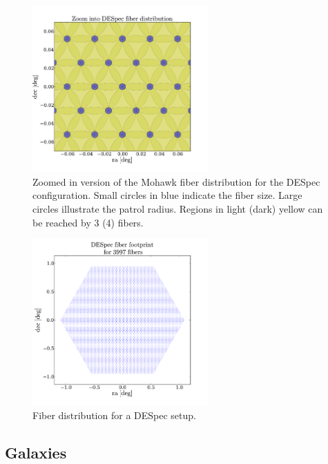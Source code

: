 \documentclass{article}
\begin{document}
\begin{figure}
\begin{center}
\includegraphics[keepaspectratio=true,width=0.6\textwidth]{DES_fibers_zoom.pdf}
\caption{\label{fig:1}Zoomed in version of the Mohawk fiber
  distribution for the DESpec configuration. Small circles in blue
  indicate the fiber size. Large circles illustrate the patrol
  radius. Regions in light (dark) yellow can be reached by 3 (4)
  fibers.} 
\end{center}
\end{figure}




\begin{figure}
\begin{center}
\includegraphics[keepaspectratio=true,width=0.6\textwidth]{DES_fibers.pdf}
\caption{\label{fig:2}Fiber distribution for a DESpec setup.}
\end{center}
\end{figure}


\subsection{Galaxies}
\end{document}
